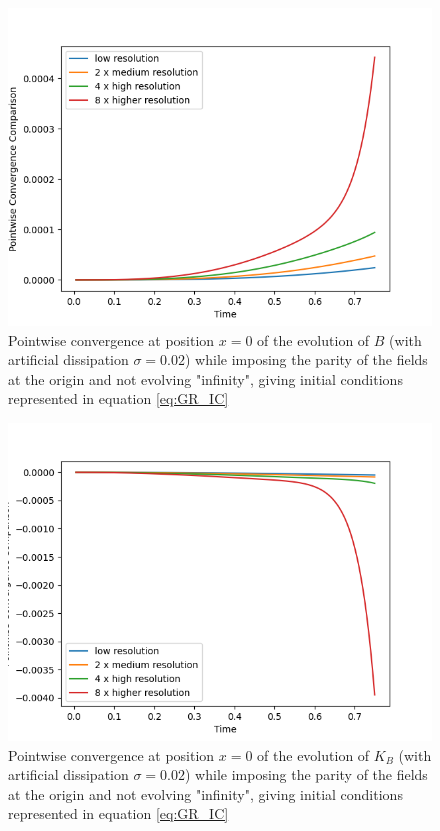 \begin{figure}[H]
    \centering
    \includegraphics[width=0.9\columnwidth]{Images/B-point.png}
    \caption{Pointwise convergence at position $x = 0$ of the evolution of $B$ (with artificial dissipation $\sigma = 0.02$) while imposing the parity of the fields at the origin and not evolving "infinity", giving initial conditions represented in equation \ref{eq:GR_IC}}
    \label{fig:point_B}
\end{figure}

\newpage

\begin{figure}[H]
    \centering
    \includegraphics[width=0.9\columnwidth]{Images/KB-point.png}
    \caption{Pointwise convergence at position $x = 0$ of the evolution of $K_B$ (with artificial dissipation $\sigma = 0.02$) while imposing the parity of the fields at the origin and not evolving "infinity", giving initial conditions represented in equation \ref{eq:GR_IC}}
    \label{fig:point_KB}
\end{figure}

